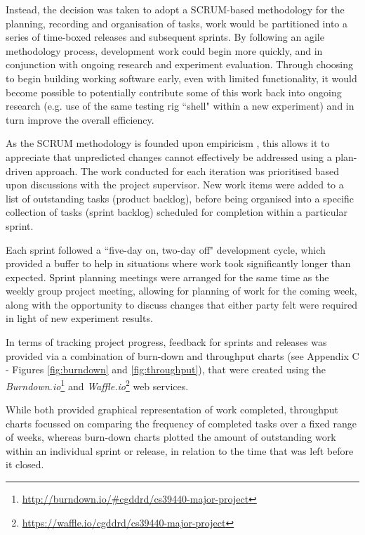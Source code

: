 Instead, the decision was taken to adopt a SCRUM-based methodology for the planning, recording and organisation of tasks, work would be partitioned into a series of time-boxed releases and subsequent sprints. By following an agile methodology process, development work could begin  more quickly, and in conjunction with ongoing research and experiment evaluation. Through choosing to begin building working software early, even with limited functionality, it would become possible to potentially contribute some of this work back into ongoing research (e.g. use of the same testing rig ``shell" within a new experiment) and in turn improve the overall efficiency.

As the SCRUM methodology is founded upon empiricism \cite{scrum}, this allows it to appreciate that unpredicted changes cannot effectively be addressed using a plan-driven approach. The work conducted for each iteration was prioritised based upon discussions with the project supervisor. New work items were added to a list of outstanding tasks (product backlog), before being organised into a specific collection of tasks (sprint backlog) scheduled for completion within a particular sprint.

Each sprint followed a ``five-day on, two-day off" development cycle, which provided a buffer to help in situations where work took significantly longer than expected. Sprint planning meetings were arranged for the same time as the weekly group project meeting, allowing for planning of work for the coming week, along with the opportunity to discuss changes that either party felt were required in light of new experiment results.

In terms of tracking project progress, feedback for sprints and releases was provided via a combination of burn-down and throughput charts (see Appendix C - Figures \ref{fig:burndown} and \ref{fig:throughput}), that were created using the \textit{Burndown.io}\footnote{\url{http://burndown.io/#cgddrd/cs39440-major-project}} and \textit{Waffle.io}\footnote{\url{https://waffle.io/cgddrd/cs39440-major-project}} web services. 

While both provided graphical representation of work completed, throughput charts focussed on comparing the frequency of completed tasks over a fixed range of weeks, whereas burn-down charts plotted the amount of outstanding work within an individual sprint or release, in relation to the time that was left before it closed.

